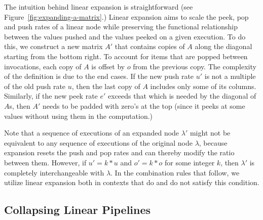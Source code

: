 The intuition behind linear expansion is straightforward (see
Figure~\ref{fig:expanding-a-matrix}.)  Linear expansion aims to scale
the peek, pop and push rates of a linear node while preserving the
functional relationship between the values pushed and the values
peeked on a given execution. To do this, we construct a new matrix
$A'$ that contains copies of $A$ along the diagonal starting from the 
bottom right.  To account for items that are popped between invocations, 
each copy of $A$ is offset by $o$ from the previous copy. 
The complexity of the definition is
due to the end cases.  If the new push rate $u'$ is not a multiple of
the old push rate $u$, then the last copy of $A$ includes only some of
its columns.  Similarly, if the new peek rate $e'$ exceeds that which
is needed by the diagonal of $A$s, then $A'$ needs to be padded with
zero's at the top (since it peeks at some values without using them in
the computation.)

Note that a sequence of executions of an expanded node $\lambda'$
might not be equivalent to any sequence of executions of the original
node $\lambda$, because expansion resets the push and pop rates and
can thereby modify the ratio between them.  However, if $u' = k * u$
and $o' = k * o$ for some integer $k$, then $\lambda'$ is completely
interchangeable with $\lambda$.  In the combination rules that follow,
we utilize linear expansion both in contexts that do and do not
satisfy this condition.

\subsection{Collapsing Linear Pipelines}


